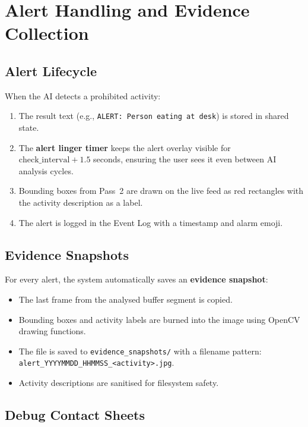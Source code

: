 \documentclass[12pt,a4paper]{article}
\begin{document}
\section{Alert Handling and Evidence Collection}

\subsection{Alert Lifecycle}

When the AI detects a prohibited activity:

\begin{enumerate}
    \item The result text (e.g., \texttt{ALERT: Person eating at desk}) is stored in shared state.
    \item The \textbf{alert linger timer} keeps the alert overlay visible for $\text{check\_interval} + 1.5$ seconds, ensuring the user sees it even between AI analysis cycles.
    \item Bounding boxes from Pass~2 are drawn on the live feed as red rectangles with the activity description as a label.
    \item The alert is logged in the Event Log with a timestamp and alarm emoji.
\end{enumerate}

\subsection{Evidence Snapshots}

For every alert, the system automatically saves an \textbf{evidence snapshot}:

\begin{itemize}[noitemsep]
    \item The last frame from the analysed buffer segment is copied.
    \item Bounding boxes and activity labels are burned into the image using OpenCV drawing functions.
    \item The file is saved to \texttt{evidence\_snapshots/} with a filename pattern: \texttt{alert\_YYYYMMDD\_HHMMSS\_<activity>.jpg}.
    \item Activity descriptions are sanitised for filesystem safety.
\end{itemize}

\subsection{Debug Contact Sheets}
\end{document}
